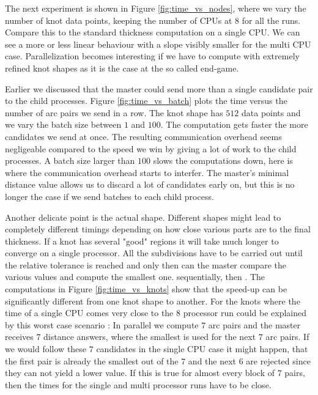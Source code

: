 \documentclass{article}
\begin{document}
The next experiment is shown in Figure \ref{fig:time_vs_nodes}, where we vary the number of
knot data points, keeping the number of CPUs at $8$ for all the runs. Compare this to the
standard thickness computation on a single CPU. We can see a more or less linear behaviour with
a slope visibly smaller for the multi CPU case. Parallelization becomes interesting if we
have to compute with extremely refined knot shapes as it is the case at the so called end-game.

Earlier we discussed that the master could send more than a single candidate pair to the
child processes. Figure \ref{fig:time_vs_batch} plots the time versus the number of arc
pairs we send in a row. The knot shape has $512$ data points and we vary the batch size
between $1$ and $100$. The computation gets faster the more candidates we send at once.
The resulting communication overhead seems negligeable compared to the speed we win by giving a
lot of work to the child processes. A batch size larger than $100$ slows the computations
down, here is where the communication overhead starts to interfer. The master's minimal distance
value allows us to discard a lot of candidates early on, but this is no longer the case if
we send batches to each child process.

Another delicate point is the actual shape. Different shapes might lead to completely different
timings depending on how close various parts are to the final thickness. If a knot has several
"good" regions it will take much longer to converge on a single processor. All the subdivisions
have to be carried out until the relative tolerance is reached and only then can the master
compare the various values and compute the smallest one. sequentially, then . The computations
in Figure \ref{fig:time_vs_knots} show that the speed-up can be significantly different from
one knot shape to another. For the knots where the time of a single CPU comes very close to the $8$
processor run could be explained by this worst case scenario : In parallel we compute $7$ arc pairs
and the master receives $7$ distance answers, where the smallest is used for the next $7$ arc pairs.
If we would follow these $7$ candidates in the single CPU case it might happen, that the first
pair is already the smallest out of the $7$ and the next $6$ are rejected since they can not yield
a lower value. If this is true for almost every block of $7$ pairs, then the times for the single
and multi processor runs have to be close.
\end{document}
